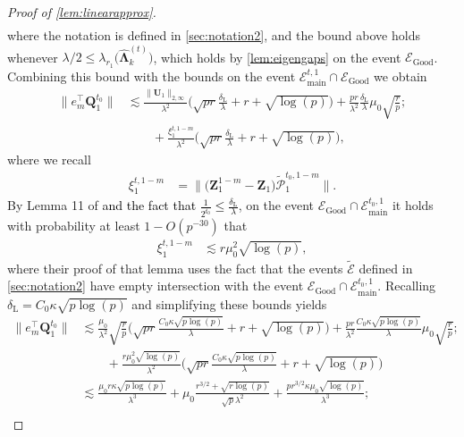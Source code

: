 \documentclass[10pt]{article}
\newcommand{\0}{{\mathbf{0}}}
\newcommand{\1}{{\mathbf{1}}}
\newcommand{\U}{{\mathbf{U}}}
\renewcommand{\citet}{\cite}
\renewcommand{\t}{^{\top}}
\newcommand{\dl}{\delta_{\mathrm{L}}}
\renewcommand{\tilde}{\widetilde}
\renewcommand{\hat}{\widehat}
\renewcommand{\hat}{\widehat}
\begin{document}
\begin{proof}[Proof of \cref{lem:linearapprox}]
\begin{align*}
\end{align*}
where the notation is defined in \cref{sec:notation2}, and the bound above holds whenever $\lambda/2 \leq \lambda_{r_1}\big( \mathbf{\hat \Lambda}_k^{(t)}\big)$, which holds by \cref{lem:eigengaps} on the event $\mathcal{E}_{\mathrm{Good}}$.  Combining this bound with the bounds on the event $\mathcal{E}_{\mathrm{main}}^{t,1} \cap \mathcal{E}_{\mathrm{Good}}$ we obtain
\begin{align*}
    \| e_m\t \mathbf{Q}_1^{t_0} \| &\lesssim  \frac{\|\U_1\|_{2,\infty}}{\lambda^2} \bigg( \sqrt{pr} \frac{\dl}{\lambda} + r + \sqrt{\log(p)} \bigg) + \frac{pr}{\lambda^2} \frac{\dl}{\lambda} \mu_0 \sqrt{\frac{r}{p}};\\
    &\qquad + \frac{\xi_1^{t,1-m}}{\lambda^2} \bigg( \sqrt{pr} \frac{\dl}{\lambda} + r + \sqrt{\log(p)} \bigg),
\end{align*}
where we recall
\begin{align*}
    \xi_1^{t,1-m} &= \bigg\| \bigg( \mathbf{Z}_1^{1-m} - \mathbf{Z}_1 \bigg) \mathcal{\tilde P}_1^{t_0,1-m} \bigg\|.
\end{align*}
By Lemma 11 of \citet{agterberg_estimating_2022} \textcolor{black}{and the fact that $\frac{1}{2^{t_0}} \leq \frac{\dl}{\lambda}$}, on the event $\mathcal{E}_{\mathrm{Good}} \cap \mathcal{E}_{\mathrm{main}}^{t_0,1}$  it holds  with probability at least $1 - O(p^{-30})$ that
\begin{align*}
    \xi_1^{t,1-m} &\lesssim r \mu_0^2 \sqrt{\log(p)},
\end{align*}
where their proof of that lemma uses the fact that the events $\mathcal{\tilde E}$ defined in \cref{sec:notation2} have empty intersection with the event $\mathcal{E}_{\mathrm{Good}} \cap \mathcal{E}_{\mathrm{main}}^{t_0,1}$.  
Recalling $\dl = C_0 \kappa \sqrt{p\log(p)}$ and simplifying these bounds yields
\begin{align*}
    \| e_m\t \mathbf{Q}_1^{t_0} \| &\lesssim  \frac{\mu_0}{\lambda^2} \sqrt{\frac{r}{p}} \bigg( \sqrt{pr} \frac{C_0 \kappa\sqrt{p\log(p)}}{\lambda} + r + \sqrt{\log(p)} \bigg) + \frac{pr}{\lambda^2} \frac{C_0 \kappa\sqrt{p\log(p)}}{\lambda} \mu_0 \sqrt{\frac{r}{p}};\\
    &\qquad + \frac{r \mu_0^2 \sqrt{\log(p)}}{\lambda^2} \bigg( \sqrt{pr} \frac{C_0 \kappa\sqrt{p\log(p)}}{\lambda} + r + \sqrt{\log(p)} \bigg) \\
    &\lesssim \frac{\mu_0 r \kappa \sqrt{p\log(p)}}{\lambda^3} + \mu_0\frac{r^{3/2} + \sqrt{r\log(p)}}{\sqrt{p}\lambda^2} + \frac{pr^{3/2} \kappa \mu_0 \sqrt{\log(p)}}{\lambda^3}; \\

\end{align*}
\end{proof}
\end{document}

